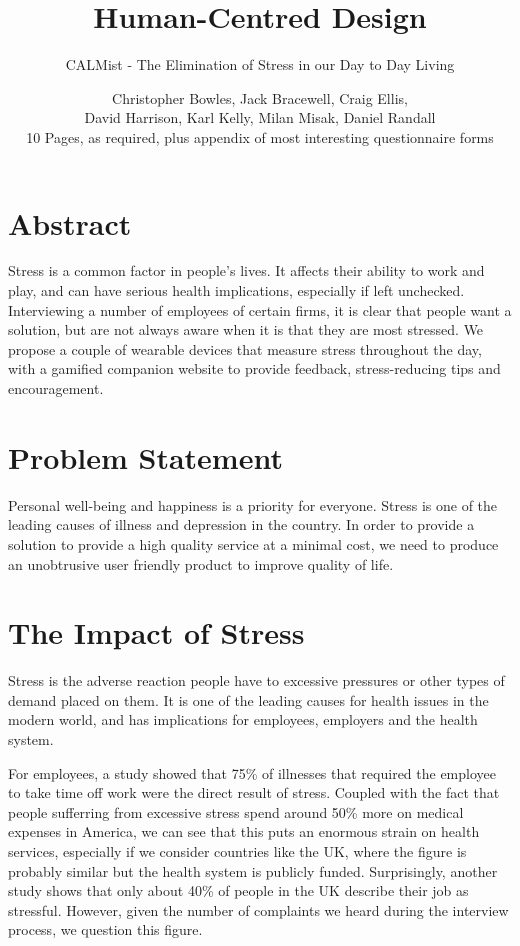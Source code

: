 \documentclass{scrartcl}
\title{Human-Centred Design}
\subtitle{CALMist - The Elimination of Stress in our Day to Day Living}
\author{Christopher Bowles, Jack Bracewell, Craig Ellis,\\David Harrison, Karl Kelly, Milan Misak, Daniel Randall\\
{\small 10 Pages, as required, plus appendix of most interesting questionnaire forms}}
\date{}
\begin{document}
\maketitle
\vspace{-1.5cm}
\tableofcontents
\clearpage

\section{Abstract}
Stress is a common factor in people's lives. It affects their ability to work and play, and can have serious health
implications, especially if left unchecked. Interviewing a number of employees of certain firms, it is clear that
people want a solution, but are not always aware when it is that they are most stressed. We propose a couple of
wearable devices that measure stress throughout the day, with a gamified companion website to provide feedback,
stress-reducing tips and encouragement.

\section{Problem Statement}
Personal well-being and happiness is a priority for everyone.
Stress is one of the leading causes of illness and depression in the country.
In order to provide a solution to provide a high quality service at a minimal cost,
we need to produce an unobtrusive user friendly product to improve quality of life.

\section{The Impact of Stress}
Stress is the adverse reaction people have to excessive pressures or other types of demand placed on them.
It is one of the leading causes for health issues in the modern world, and has implications for
employees, employers and the health system.

For employees, a study showed that 75\% of illnesses that required the employee to take time off work were
the direct result of stress. Coupled with the fact that people sufferring from excessive stress spend around 50\%
more on medical expenses in America, we can see that this puts an enormous strain on health services, especially
if we consider countries like the UK, where the figure is probably similar but the health system is publicly funded.
Surprisingly, another study shows that only about 40\% of people in the UK describe their job as stressful. However,
given the number of complaints we heard during the interview process, we question this figure.
\end{document}
